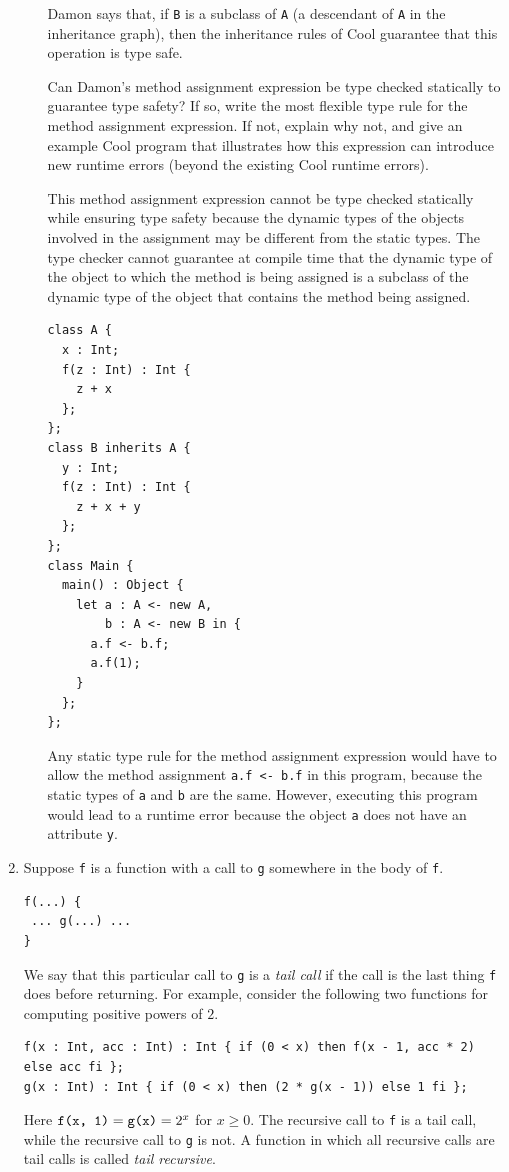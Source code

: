 \documentclass[11pt]{article}
\begin{document}
\begin{enumerate}
\begin{enumerate}
Damon says that, if \texttt{B} is a subclass of \texttt{A} (a
descendant of \texttt{A} in the inheritance graph), then the
inheritance rules of Cool guarantee that this operation is type safe.

Can Damon's method assignment expression be type checked statically to
guarantee type safety?  If so, write the most flexible type rule for
the method assignment expression.  If not, explain why not, and give
an example Cool program that illustrates how this expression can
introduce new runtime errors (beyond the existing Cool runtime
errors).

This method assignment expression cannot be type checked statically
while ensuring type safety because the dynamic types of the objects
involved in the assignment may be different from the static types.
The type checker cannot guarantee at compile time that the dynamic
type of the object to which the method is being assigned is a subclass
of the dynamic type of the object that contains the method being
assigned.
\begin{verbatim}
class A {
  x : Int;
  f(z : Int) : Int {
    z + x
  };
};
class B inherits A {
  y : Int;
  f(z : Int) : Int {
    z + x + y
  };
};
class Main {
  main() : Object {
    let a : A <- new A,
        b : A <- new B in {
      a.f <- b.f;
      a.f(1);
    }
  };
};
\end{verbatim}

Any static type rule for the method assignment expression would have
to allow the method assignment \texttt{a.f <- b.f} in this program,
because the static types of \texttt{a} and \texttt{b} are the same.
However, executing this program would lead to a runtime error because
the object \texttt{a} does not have an attribute \texttt{y}.
\end{enumerate}

\item Suppose \texttt{f} is a function with a call to \texttt{g}
somewhere in the body of \texttt{f}.
\begin{verbatim}
f(...) {
 ... g(...) ...
}
\end{verbatim}
We say that this particular call to \texttt{g} is a {\it tail call}
if the call is the last thing \texttt{f} does before returning.  For
example, consider the following two functions for computing positive
powers of $2$.
\begin{verbatim}
f(x : Int, acc : Int) : Int { if (0 < x) then f(x - 1, acc * 2) else acc fi };
g(x : Int) : Int { if (0 < x) then (2 * g(x - 1)) else 1 fi };
\end{verbatim}
Here $\verb'f(x, 1)' = \verb'g(x)' = 2^x$ for $x\geq 0$.  The
recursive call to \texttt{f} is a tail call, while the recursive call
to \texttt{g} is not.  A function in which all recursive calls are
tail calls is called {\it tail recursive}.


\end{enumerate}
\end{document}
